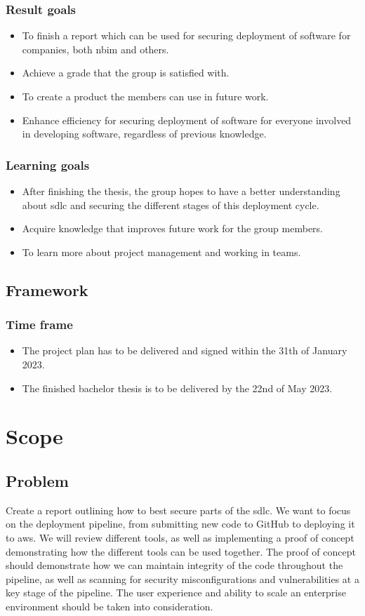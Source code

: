 \subsubsection{Result goals}
\begin{itemize}
    \item To finish a report which can be used for securing deployment of software for companies, both \acrshort{nbim} and others.
    \item Achieve a grade that the group is satisfied with.
    \item To create a product the members can use in future work.
    \item Enhance efficiency for securing deployment of software for everyone involved in developing software, regardless of previous knowledge. 
\end{itemize}

\subsubsection{Learning goals}
\begin{itemize}
    \item After finishing the thesis, the group hopes to have a better understanding about \acrshort{sdlc} and securing the different stages of this deployment cycle. 
    \item Acquire knowledge that improves future work for the group members.
    \item To learn more about project management and working in teams. 
\end{itemize}
\subsection{Framework}
\subsubsection{Time frame}
\begin{itemize}
    \item The project plan has to be delivered and signed within the 31th of January 2023.
    \item The finished bachelor thesis is to be delivered by the 22nd of May 2023. 
\end{itemize}
\newpage
\section{Scope}
\subsection{Problem }
Create a report outlining how to best secure parts of the  \acrshort{sdlc}. We want to focus on the deployment pipeline, from submitting new code to GitHub to deploying it to \acrlong{aws}. We will review different tools, 
as well as implementing a proof of concept demonstrating how the different tools can be used together. The proof of concept should demonstrate how we can maintain integrity of the code throughout the pipeline, as well as scanning for security  misconfigurations and vulnerabilities at a key stage of the pipeline. The user experience and ability to scale an enterprise environment should be taken into consideration. 

